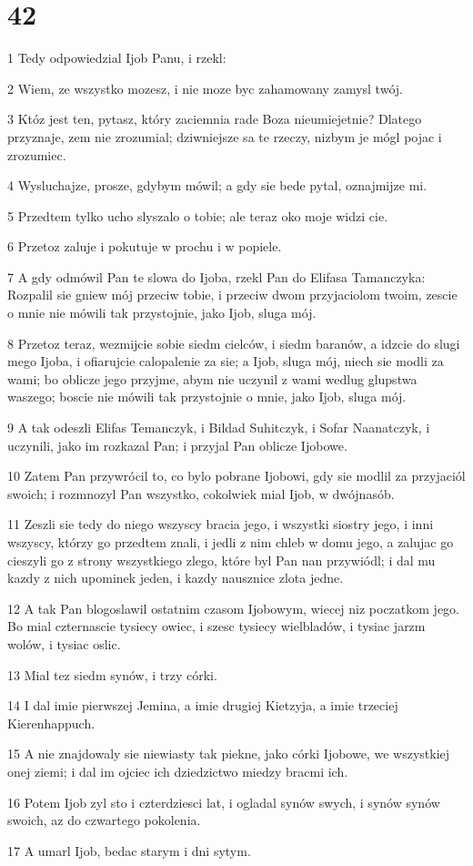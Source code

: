 \chapter{42}

\par 1 Tedy odpowiedzial Ijob Panu, i rzekl:
\par 2 Wiem, ze wszystko mozesz, i nie moze byc zahamowany zamysl twój.
\par 3 Któz jest ten, pytasz, który zaciemnia rade Boza nieumiejetnie? Dlatego przyznaje, zem nie zrozumial; dziwniejsze sa te rzeczy, nizbym je mógl pojac i zrozumiec.
\par 4 Wysluchajze, prosze, gdybym mówil; a gdy sie bede pytal, oznajmijze mi.
\par 5 Przedtem tylko ucho slyszalo o tobie; ale teraz oko moje widzi cie.
\par 6 Przetoz zaluje i pokutuje w prochu i w popiele.
\par 7 A gdy odmówil Pan te slowa do Ijoba, rzekl Pan do Elifasa Tamanczyka: Rozpalil sie gniew mój przeciw tobie, i przeciw dwom przyjaciolom twoim, zescie o mnie nie mówili tak przystojnie, jako Ijob, sluga mój.
\par 8 Przetoz teraz, wezmijcie sobie siedm cielców, i siedm baranów, a idzcie do slugi mego Ijoba, i ofiarujcie calopalenie za sie; a Ijob, sluga mój, niech sie modli za wami; bo oblicze jego przyjme, abym nie uczynil z wami wedlug glupstwa waszego; boscie nie mówili tak przystojnie o mnie, jako Ijob, sluga mój.
\par 9 A tak odeszli Elifas Temanczyk, i Bildad Suhitczyk, i Sofar Naanatczyk, i uczynili, jako im rozkazal Pan; i przyjal Pan oblicze Ijobowe.
\par 10 Zatem Pan przywrócil to, co bylo pobrane Ijobowi, gdy sie modlil za przyjaciól swoich; i rozmnozyl Pan wszystko, cokolwiek mial Ijob, w dwójnasób.
\par 11 Zeszli sie tedy do niego wszyscy bracia jego, i wszystki siostry jego, i inni wszyscy, którzy go przedtem znali, i jedli z nim chleb w domu jego, a zalujac go cieszyli go z strony wszystkiego zlego, które byl Pan nan przywiódl; i dal mu kazdy z nich upominek jeden, i kazdy nausznice zlota jedne.
\par 12 A tak Pan blogoslawil ostatnim czasom Ijobowym, wiecej niz poczatkom jego. Bo mial czternascie tysiecy owiec, i szesc tysiecy wielbladów, i tysiac jarzm wolów, i tysiac oslic.
\par 13 Mial tez siedm synów, i trzy córki.
\par 14 I dal imie pierwszej Jemina, a imie drugiej Kietzyja, a imie trzeciej Kierenhappuch.
\par 15 A nie znajdowaly sie niewiasty tak piekne, jako córki Ijobowe, we wszystkiej onej ziemi; i dal im ojciec ich dziedzictwo miedzy bracmi ich.
\par 16 Potem Ijob zyl sto i czterdziesci lat, i ogladal synów swych, i synów synów swoich, az do czwartego pokolenia.
\par 17 A umarl Ijob, bedac starym i dni sytym.


